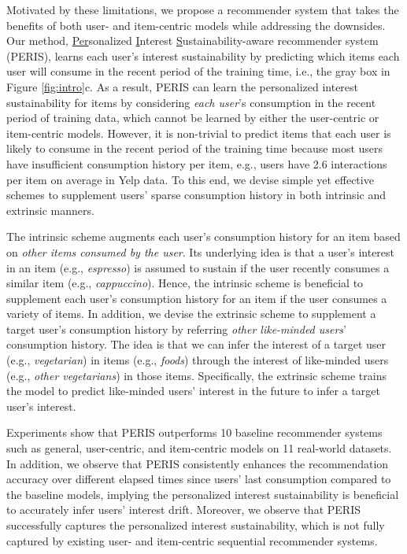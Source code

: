 \documentclass[sigconf]{acmart}
\newcommand{\MD}{{\small\textsf{PERIS}}}
\begin{document}
Motivated by these limitations, we propose a recommender system that takes the benefits of both user- and item-centric models while addressing  the downsides. 
Our method, \underline{Per}sonalized \underline{I}nterest \underline{S}ustainability-aware recommender system (\MD), learns each user's interest sustainability by predicting which items each user will consume in the recent period of the training time, i.e., the gray box in Figure \ref{fig:intro}c.
As a result, \MD{} can learn the personalized interest sustainability for items by considering \textit{each user}'s consumption in the recent period of training data, which cannot be learned by either the user-centric or item-centric models. 
However, it is non-trivial to predict items that each user is likely to consume in the recent period of the training time because most users have insufficient consumption history per item, e.g., users have 2.6 interactions per item on average in Yelp data.
To this end, we devise simple yet effective schemes to supplement users' sparse consumption history in both intrinsic and extrinsic manners. 


The intrinsic scheme augments each user's consumption history for an item based on \textit{other items consumed by the user}. 
Its underlying idea is that a user's interest in an item (e.g., \textit{espresso}) is assumed to sustain if the user recently consumes a similar item (e.g., \textit{cappuccino}).
Hence, the intrinsic scheme is beneficial to supplement each user's consumption history for an item if the user consumes a variety of items. 
In addition, we devise the extrinsic scheme to supplement a target user's consumption history by referring \textit{other like-minded users}' consumption history.
The idea is that we can infer the interest of a target user (e.g., \textit{vegetarian}) in items (e.g., \textit{foods}) through the interest of like-minded users (e.g., \textit{other vegetarians}) in those items. 
Specifically, the extrinsic scheme trains the model to predict like-minded users' interest in the future to infer a target user's interest. 

Experiments show that \MD{} outperforms 10 baseline recommender systems such as general, user-centric, and item-centric models on 11 real-world datasets. 
In addition, we observe that \MD{} consistently enhances the recommendation accuracy over different elapsed times since users' last consumption compared to the baseline models, implying the personalized interest sustainability is beneficial to accurately infer users’ interest drift.
Moreover, we observe that \MD{} successfully captures the personalized interest sustainability, which is not fully captured by existing user- and item-centric sequential recommender systems. 
\end{document}
